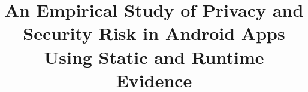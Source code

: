 \title{An Empirical Study of Privacy and Security Risk in Android Apps Using Static and Runtime Evidence}



\maketitle


